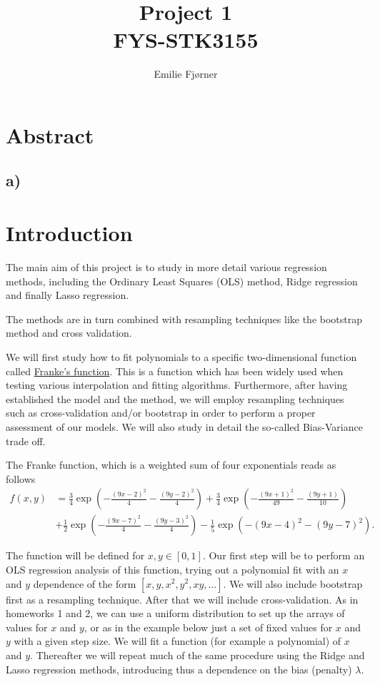 \documentclass[%
oneside,                 %
final,                   %
11pt,
titlepage,
english]{article}
\author{Emilie Fjørner}
\title{Project 1 \\ FYS-STK3155}
\begin{document}
	
	\maketitle
	
	\section*{Abstract}
	
	\subsection*{a)}
	
	\section*{Introduction}
	The main aim of this project is to study in more detail various
	regression methods, including the Ordinary Least Squares (OLS) method,
	Ridge regression and finally Lasso regression. 
	
	The methods are in turn combined with resampling techniques like the bootstrap method and cross validation. 
	
	We will first study how to fit polynomials to a specific
	two-dimensional function called \href{{http://www.dtic.mil/dtic/tr/fulltext/u2/a081688.pdf}}{Franke's function}.  
	This is a function which has been widely used when testing various
	interpolation and fitting algorithms. Furthermore, after having
	established the model and the method, we will employ resampling
	techniques such as cross-validation and/or bootstrap in order to perform a
	proper assessment of our models. We will also study in detail the
	so-called Bias-Variance trade off.
	
	
	The Franke function, which is a weighted sum of four exponentials  reads as follows
	\begin{align*}
		f(x,y) &= \frac{3}{4}\exp{\left(-\frac{(9x-2)^2}{4} - \frac{(9y-2)^2}{4}\right)}+\frac{3}{4}\exp{\left(-\frac{(9x+1)^2}{49}- \frac{(9y+1)}{10}\right)} \\
		&+\frac{1}{2}\exp{\left(-\frac{(9x-7)^2}{4} - \frac{(9y-3)^2}{4}\right)} -\frac{1}{5}\exp{\left(-(9x-4)^2 - (9y-7)^2\right) }.
	\end{align*}
	
	The function will be defined for $x,y\in [0,1]$.  Our first step will
	be to perform an OLS regression analysis of this function, trying out
	a polynomial fit with an $x$ and $y$ dependence of the form $[x, y,
	x^2, y^2, xy, \dots]$. We will also include bootstrap first as
	a resampling technique.  After that we will include cross-validation. As in homeworks 1 and 2, we can use a uniform
	distribution to set up the arrays of values for $x$ and $y$, or as in
	the example below just a set of fixed 
	values for $x$ and $y$ with a given step
	size.  We will fit a
	function (for example a polynomial) of $x$ and $y$.  Thereafter we
	will repeat much of the same procedure using the Ridge and Lasso
	regression methods, introducing thus a dependence on the bias
	(penalty) $\lambda$.
	
\end{document}
